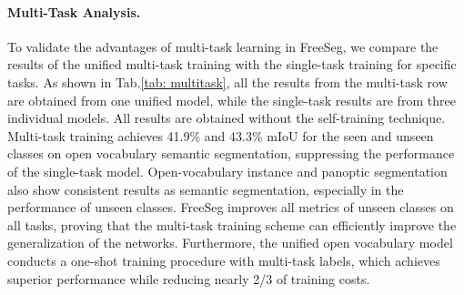 \documentclass[10pt,twocolumn,letterpaper]{article}
\begin{document}
\begin{table*}[tp]
    \centering
    \footnotesize
    \caption{Comparison of different training paradigms and prompt solutions on COCO.
    }
    \vspace{-8pt}
    \begin{threeparttable}
        \end{threeparttable}
        \label{tab: multitask}
\end{table*}  


\paragraph{Multi-Task Analysis.}
To validate the advantages of multi-task learning in FreeSeg, we compare the results of the unified multi-task training with the single-task training for specific tasks. 
As shown in Tab.\ref{tab: multitask}, all the results from the multi-task row are obtained from one unified model, while the single-task results are from three individual models. All results are obtained without the self-training technique. 
Multi-task training achieves 41.9\% and 43.3\%  mIoU for the seen and unseen classes on open vocabulary semantic segmentation, suppressing the performance of the single-task model. 
Open-vocabulary instance and panoptic segmentation also show consistent results as semantic segmentation, especially in the performance of unseen classes. 
FreeSeg improves all metrics of unseen classes on all tasks, proving that the multi-task training scheme can efficiently improve the generalization of the networks.
Furthermore, the unified open vocabulary model conducts a one-shot training procedure with multi-task labels, which achieves superior performance while reducing nearly 2/3 of training costs.
\end{document}
